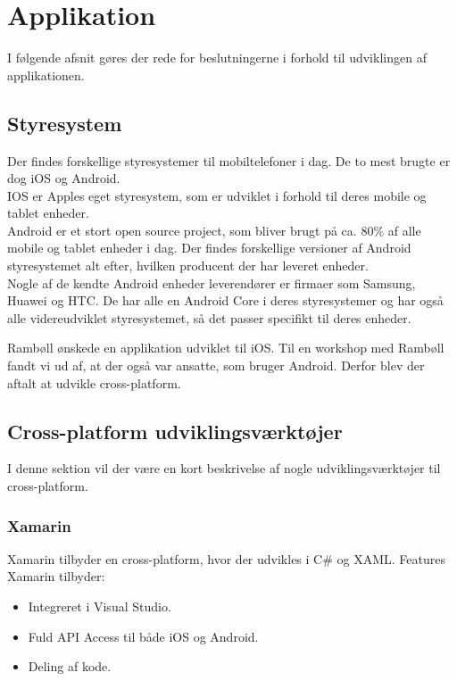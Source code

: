 \section{Applikation}                                   
I følgende afsnit gøres der rede for beslutningerne i forhold til udviklingen af applikationen.

\subsection{Styresystem}
Der findes forskellige styresystemer til mobiltelefoner i dag. De to mest brugte\cite{OS} er dog iOS \cite{iOS} og Android. \cite{Android} \\
IOS er Apples eget styresystem, som er udviklet i forhold til deres mobile og tablet enheder. \\
Android er et stort open source project, som bliver brugt på ca. 80\% af alle mobile og tablet enheder i dag. Der findes forskellige versioner af Android styresystemet alt efter, hvilken producent der har leveret enheder\cite{OS}. \\
Nogle af de kendte Android enheder leverendører er firmaer som Samsung, Huawei og HTC. De har alle en Android Core i deres styresystemer og har også alle videreudviklet styresystemet, så det passer specifikt til deres enheder.

Rambøll ønskede en applikation udviklet til iOS. Til en workshop med Rambøll fandt vi ud af, at der også var ansatte, som bruger Android. Derfor blev der aftalt at udvikle cross-platform.

\subsection{Cross-platform udviklingsværktøjer}
I denne sektion vil der være en kort beskrivelse af nogle udviklingsværktøjer til cross-platform.

\subsubsection{Xamarin}
Xamarin\cite{Xarmain} tilbyder en cross-platform, hvor der udvikles i C\#\cite{CSharp} og XAML\cite{XAML}.
Features Xamarin tilbyder:
\begin{itemize}[-]
	\item Integreret i Visual Studio.
	\item Fuld API Access til både iOS og Android.
	\item Deling af kode.
\end{itemize}

